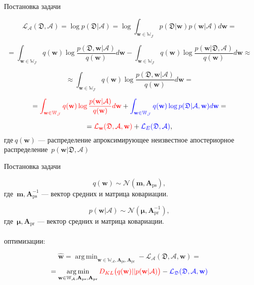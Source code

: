 \documentclass[10pt]{beamer}
\DeclareMathOperator*{\argmin}{arg\,min}
\begin{document}
\begin{frame}{Постановка задачи}

$$\mathcal{L}_{\mathcal{A}}(\mathfrak{D},\mathcal{A}) = \log p(\mathfrak{D}|\mathcal{A}) = \log  \int_{{\textbf{w}\in\mathbb{W_\mathcal{J}}}}
p(\mathfrak{D} | \textbf{w}) p(\textbf{w} | \mathcal{A}) d \textbf{w} = $$

$$ =\int_{\textbf{w}\in\mathbb{W_\mathcal{J}}} q(\textbf{w}) \log \frac{p(\mathfrak{D}, \textbf{w}|\mathcal{A})}{q(\textbf{w})}d \textbf{w} - \int_{\textbf{w}\in\mathbb{W_\mathcal{J}}}  q(\textbf{w}) \log \frac{p(\textbf{w}|\mathfrak{D},\mathcal{A})}{q(\textbf{w})}d \textbf{w} \approx $$

$$\approx \int_{\textbf{w}\in\mathbb{W_\mathcal{J}}} q(\textbf{w}) \log \frac{p(\mathfrak{D}, \textbf{w}|\mathcal{A})}{q(\textbf{w})}d \textbf{w} = $$

$$= \textcolor[rgb]{1,0,0}{\int_{\textbf{w}\in\mathbb{W_\mathcal{J}}} q(\textbf{w}) \log \frac{p(\textbf{w}| \mathcal{A})}{q(\textbf{w})}d \textbf{w}} + \textcolor[rgb]{0,0,1}{\int_{\textbf{w}\in\mathbb{W_\mathcal{J}}} q(\textbf{w}) \log p(\mathfrak{D}|\mathcal{A}, \textbf{w})d \textbf{w}}=$$

$$= \textcolor[rgb]{1,0,0}{\mathcal{L}_{\textbf{w}}(\mathfrak{D}, \mathcal{A}, \textbf{w})}+\textcolor[rgb]{0,0,1}{\mathcal{L}_{E}(\mathfrak{D},\mathcal{A})},$$
$\text{где}~q(\textbf{w})$ --- распределение апроксимирующее неизвестное апостериорное распределение~$p(\textbf{w}|\mathfrak{D},\mathcal{A})$

\end{frame}

\begin{frame}{Постановка задачи}

$$q(\textbf{w})\sim \mathcal{N}(\textbf{m}, \textbf{A}_\text{ps}),$$
где~$\textbf{m}, \textbf{A}^{-1}_\text{ps}$ --- вектор средних и матрица ковариации.

$$p(\textbf{w} | \mathcal{A})\sim \mathcal{N}(\boldsymbol{\mu},\textbf{A}^{-1}_{\text{pr}}),$$
где~$\boldsymbol{\mu},\textbf{A}_{\text{pr}}$ --- вектор средних и матрица ковариации.\\
~\\

{ оптимизации:}

$$\hat{\textbf{w}} = \argmin_{\textbf{w} \in \mathbb{W_\mathcal{A}}, \textbf{A}_\text{ps}, \textbf{A}_\text{pr}} -\mathcal{L}_\mathcal{A}(\mathfrak{D}, \mathcal{A}, \textbf{w}) = $$
$$=\argmin_{\textbf{w} \in \mathbb{W_\mathcal{A} }, \textbf{A}_\text{ps}, \textbf{A}_\text{pr}} \textcolor[rgb]{1,0,0}{D_{KL}\bigl(q(\textbf{w})||p(\textbf{w}|\mathcal{A})\bigr)} - \textcolor[rgb]{0,0,1}{\mathcal{L}_\mathfrak{D}(\mathfrak{D}, \mathcal{A}, \textbf{w})}$$
\end{frame}
\end{document}
